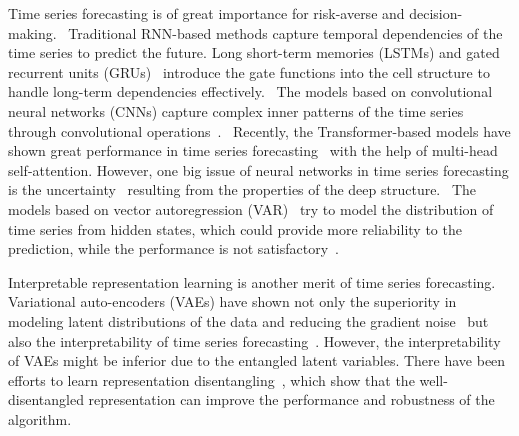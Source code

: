 Time series forecasting is of great importance for risk-averse and decision-making.~%
Traditional RNN-based methods capture temporal dependencies of the time series to predict the future. 
Long short-term memories (LSTMs) and gated recurrent units (GRUs)~\cite{yu2019review,greff2016lstm,gers2002learning,sherstinsky2020fundamentals} introduce the gate functions into the cell structure to handle long-term dependencies effectively.~%
The models based on convolutional neural networks (CNNs)
capture complex inner patterns of the time series through convolutional operations~\cite{lea2016temporal,borovykh2017conditional,binkowski2018autoregressive}.~%
Recently, the Transformer-based models have shown great performance in time series forecasting~\cite{xu2021autoformer,zhou2021informer,kitaev2020reformer,li2019enhancing} with the help of multi-head self-attention. 
However, one big issue of neural networks in time series forecasting is the   uncertainty~\cite{gawlikowski2021survey,abdar2021review} resulting from the properties of the deep structure.~%
The models based on vector autoregression (VAR)~\cite{cao2003support,fokianos2009poisson,kim2003financial} try to model the distribution of time series from hidden states, which could provide more reliability to the prediction, while the performance is not satisfactory~\cite{lai2018modeling}. 

Interpretable representation learning is another merit of time series forecasting.~%
Variational auto-encoders (VAEs) have shown not only the superiority in modeling latent distributions of the data and reducing the gradient noise~\cite{roeder2017sticking,kingma2016improved, li2016renyi, vahdat2020nvae} but also the interpretability of time series forecasting~\cite{fortuin2020gp,fortuin2019som}. 
However, the interpretability of VAEs might be inferior due to the entangled latent variables. 
There have been  efforts to learn representation disentangling~\cite{kim2018disentangling,bengio2013representation,higgins2016beta}, which show that the well-disentangled representation can  improve the performance and robustness of the algorithm.

